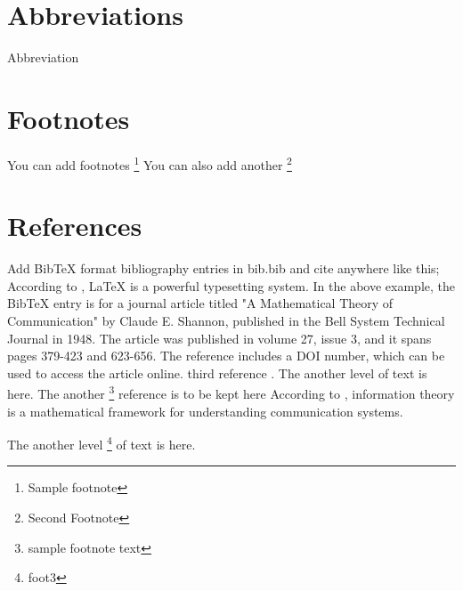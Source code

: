 \section{Abbreviations}
Abbreviation

\section{Footnotes}
You can add footnotes \footnote{Sample footnote}
You can also add another \footnote{Second Footnote}

\section{References}
Add BibTeX format bibliography entries in bib.bib and cite anywhere like this; \cite{sample_cite}
According to \cite{knuth1984texbook}, LaTeX is a powerful typesetting system.
In the above example, the BibTeX entry is for a journal article titled "A Mathematical Theory of Communication" by Claude E. Shannon, published in the Bell System Technical Journal in 1948. The article was published in volume 27, issue 3, and it spans pages 379-423 and 623-656. The reference includes a DOI number, which can be used to access\cite{sample_cite} the article online.  third reference \cite{Shannon1948}. The another level of text is here. The another \footnote{sample footnote text} reference is to be kept here
According to \cite{Shannon19482}, information theory is a mathematical framework for understanding communication systems.

The another level \footnote{foot3} of text is here.



